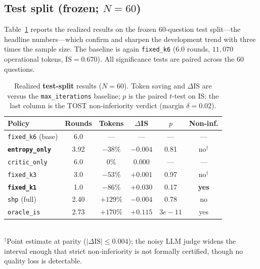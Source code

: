 \documentclass[conference]{IEEEtran}
\begin{document}
\subsection{Test split (frozen; $N=60$)}\label{sec:test}
Table~\ref{tab:test} reports the realized results on the frozen $60$-question test
split---the headline numbers---which confirm and sharpen the development trend with
three times the sample size. The baseline is again \texttt{fixed\_k6}
($6.0$ rounds, $11{,}070$ operational tokens, $\mathrm{IS}=0.670$). All
significance tests are paired across the $60$ questions.

\begin{table}[t]
\centering\scriptsize
\caption{Realized \textbf{test-split} results ($N=60$). Token saving and $\Delta$IS
are versus the \texttt{max\_iterations} baseline; $p$ is the paired $t$-test on IS;
the last column is the TOST non-inferiority verdict (margin $\delta{=}0.02$).}
\label{tab:test}
\setlength{\tabcolsep}{3.5pt}
\begin{tabular}{lccccc}
\toprule
Policy & Rounds & Tokens & $\Delta$IS & $p$ & Non-inf. \\
\midrule
\texttt{fixed\_k6} (base) & 6.0 & --- & --- & --- & --- \\
\textbf{\texttt{entropy\_only}} & 3.92 & \textcolor{shpgreen}{$-38\%$} & $-0.004$ & 0.81 & no$^\dagger$ \\
\texttt{critic\_only} & 6.0 & $0\%$ & $0.000$ & --- & --- \\
\texttt{fixed\_k3} & 3.0 & \textcolor{shpgreen}{$-53\%$} & $+0.001$ & 0.97 & no$^\dagger$ \\
\textbf{\texttt{fixed\_k1}} & 1.0 & \textcolor{shpgreen}{$-86\%$} & $+0.030$ & 0.17 & \textbf{yes} \\
\texttt{shp} (full) & 2.40 & \textcolor{shpred}{$+129\%$} & $-0.004$ & 0.78 & no \\
\texttt{oracle\_is} & 2.73 & \textcolor{shpred}{$+170\%$} & $+0.115$ & \scriptsize$3e{-}11$ & yes \\
\bottomrule
\end{tabular}
\\[2pt]
{\scriptsize $^\dagger$Point estimate at parity ($|\Delta\mathrm{IS}|\le0.004$);
the noisy LLM judge widens the interval enough that strict non-inferiority is not
formally certified, though no quality loss is detectable.}
\end{table}
\end{document}
